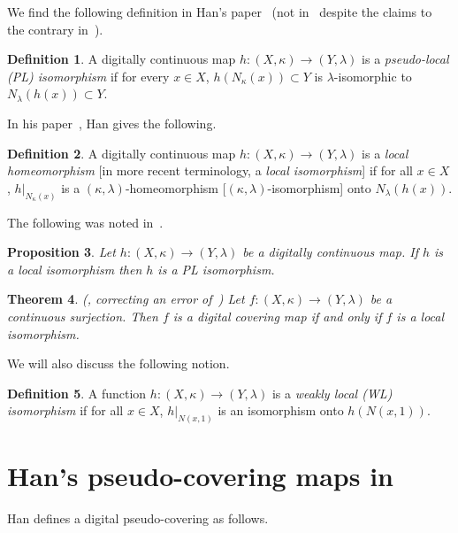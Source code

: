\documentclass{article} \UseRawInputEncoding
\theoremstyle{plain}
\newtheorem{thm}{Theorem}
\newtheorem{prop}[thm]{Proposition}
\theoremstyle{definition}
\newtheorem{definition}[thm]{Definition}
\numberwithin{thm}{section}
\begin{document}
We find the following definition in Han's
paper~\cite{Han20} (not in~\cite{Han04} despite the claims
to the contrary in~\cite{Han20,HanEquiv}).

\begin{definition}
\label{PL-iso}
A digitally continuous map $h: (X,\kappa) \to (Y,\lambda)$
is a {\em pseudo-local (PL) isomorphism} if for every
$x \in X$, $h(N_{\kappa}(x)) \subset Y$ is
$\lambda$-isomorphic to 
$N_{\lambda}(h(x)) \subset Y$.
\end{definition}

In his paper~\cite{Han04}, Han gives the following.

\begin{definition}
\label{localIso}
A digitally continuous map $h: (X,\kappa) \to (Y,\lambda)$
is a {\em local homeomorphism} [in more recent
terminology, a {\em local isomorphism}]
if for all $x \in X$, $h|_{N_{\kappa}(x)}$ is a 
$(\kappa,\lambda)$-homeomorphism
[$(\kappa,\lambda)$-isomorphism] onto
$N_{\lambda}(h(x))$.
\end{definition}

The following was noted in~\cite{BxVariants}.

\begin{prop}
\label{localPLequiv}
Let $h: (X,\kappa) \to (Y,\lambda)$ be a digitally continuous map.
If $h$ is a local isomorphism then $h$ is a PL isomorphism.
\end{prop}

\begin{thm}
    {\rm (\cite{PakZak}, correcting an error of~\cite{Han04})}
    \label{PakZakEquiv}
    Let $f: (X,\kappa) \to (Y,\lambda)$ be a continuous
    surjection. Then $f$ is a digital covering map
    if and only if $f$ is a local isomorphism.
\end{thm}

We will also discuss the following notion.

\begin{definition}
    {\rm \cite{HanUnique}}
    \label{WL-iso}
    A function $h: (X,\kappa) \to (Y,\lambda)$
    is a {\em weakly local (WL) isomorphism} if for all
    $x \in X$, $h|_{N(x,1)}$ is an isomorphism onto
    $h(N(x,1))$.
\end{definition}

\section{Han's pseudo-covering maps in~~\cite{HanEquiv}}
Han defines a digital pseudo-covering as follows.
\end{document}
